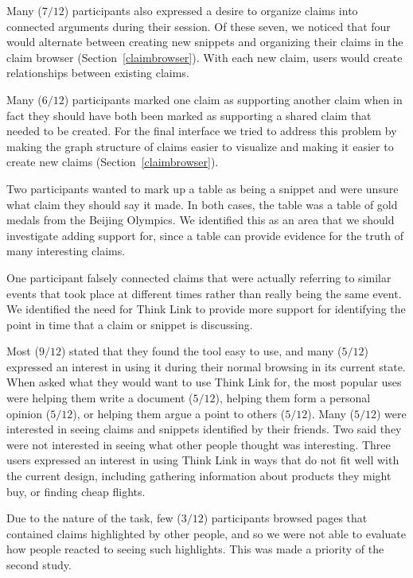 \documentclass{chi2009}
\begin{document}
Many ($7/12$) participants also expressed a desire to organize claims into connected arguments during their session. Of these seven, we noticed that four would alternate between creating new snippets and organizing their claims in the claim browser (Section~\ref{claimbrowser}). With each new claim, users would create relationships between existing claims.

Many ($6/12$) participants marked one claim as supporting another claim when in fact they should have both been marked as supporting a shared claim that needed to be created. For the final interface we tried to address this problem by making the graph structure of claims easier to visualize and making it easier to create new claims (Section~\ref{claimbrowser}).

Two participants wanted to mark up a table as being a snippet and were unsure what claim they should say it made. In both cases, the table was a table of gold medals from the Beijing Olympics. We identified this as an area that we should investigate adding support for, since a table can provide evidence for the truth of many interesting claims.

One participant falsely connected claims that were actually referring to similar events that took place at different times rather than really being the same event. We identified the need for Think Link to provide more support for identifying the point in time that a claim or snippet is discussing.

Most ($9/12$) stated that they found the tool easy to use, and many ($5/12$) expressed an interest in using it during their normal browsing in its current state. When asked what they would want to use Think Link for, the most popular uses were helping them write a document ($5/12$), helping them form a personal opinion ($5/12$), or helping them argue a point to others ($5/12$). Many ($5/12$) were interested in seeing claims and snippets identified by their friends. Two said they were not interested in seeing what other people thought was interesting. Three users expressed an interest in using Think Link in ways that do not fit well with the current design, including gathering information about products they might buy, or finding cheap flights.

Due to the nature of the task, few ($3/12$) participants browsed pages that contained claims highlighted by other people, and so we were not able to evaluate how people reacted to seeing such highlights. This was made a priority of the second study.
\end{document}
